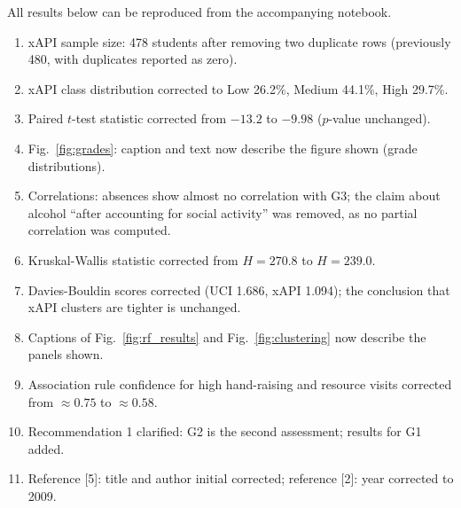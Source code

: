 \documentclass[conference]{IEEEtran}
\begin{document}

All results below can be reproduced from the accompanying notebook.
\begin{enumerate}
  \item xAPI sample size: 478 students after removing two duplicate rows (previously 480, with duplicates reported as zero).
  \item xAPI class distribution corrected to Low 26.2\%, Medium 44.1\%, High 29.7\%.
  \item Paired $t$-test statistic corrected from $-13.2$ to $-9.98$ ($p$-value unchanged).
  \item Fig.~\ref{fig:grades}: caption and text now describe the figure shown (grade distributions).
  \item Correlations: absences show almost no correlation with G3; the claim about alcohol ``after accounting for social activity'' was removed, as no partial correlation was computed.
  \item Kruskal-Wallis statistic corrected from $H = 270.8$ to $H = 239.0$.
  \item Davies-Bouldin scores corrected (UCI 1.686, xAPI 1.094); the conclusion that xAPI clusters are tighter is unchanged.
  \item Captions of Fig.~\ref{fig:rf_results} and Fig.~\ref{fig:clustering} now describe the panels shown.
  \item Association rule confidence for high hand-raising and resource visits corrected from $\approx 0.75$ to $\approx 0.58$.
  \item Recommendation 1 clarified: G2 is the second assessment; results for G1 added.
  \item Reference [5]: title and author initial corrected; reference [2]: year corrected to 2009.
\end{enumerate}
\end{document}

